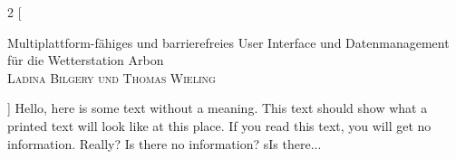 \documentclass{article}
\begin{document}
\begin{multicols}{2}
[
    \begin{center}
      {\huge\sffamily Multiplattform-fähiges und barrierefreies User Interface und Datenmanagement für die Wetterstation Arbon}\\
       \vspace{2ex}
       \textsc{Ladina Bilgery und Thomas Wieling}
    \end{center}
]
Hello, here is some text without a meaning. This text should show what a printed text will look like at this place. If you read this text, you will get no information. Really? Is there no information? sIs there...
\end{multicols}
 
\end{document}
